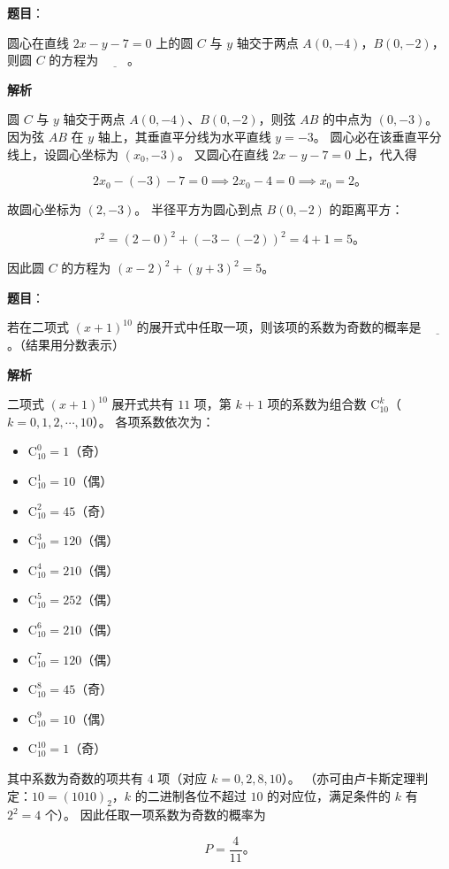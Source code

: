 \begin{answer}

\textbf{题目}：

圆心在直线 $2x - y - 7 = 0$ 上的圆 $C$ 与 $y$ 轴交于两点 $A(0, -4)$，$B(0, -2)$，则圆 $C$ 的方程为 $\underline{\qquad}$。

\textbf{解析}

圆 $C$ 与 $y$ 轴交于两点 $A(0, -4)$、$B(0, -2)$，则弦 $AB$ 的中点为 $(0, -3)$。
因为弦 $AB$ 在 $y$ 轴上，其垂直平分线为水平直线 $y = -3$。
圆心必在该垂直平分线上，设圆心坐标为 $(x_0, -3)$。
又圆心在直线 $2x - y - 7 = 0$ 上，代入得

\nopagebreak[4]
\[
2x_0 - (-3) - 7 = 0 \implies 2x_0 - 4 = 0 \implies x_0 = 2\mbox{。}
\]

故圆心坐标为 $(2, -3)$。
半径平方为圆心到点 $B(0, -2)$ 的距离平方：

\nopagebreak[4]
\[
r^2 = (2 - 0)^2 + (-3 - (-2))^2 = 4 + 1 = 5\mbox{。}
\]

因此圆 $C$ 的方程为 $(x - 2)^2 + (y + 3)^2 = 5$。


\end{answer}
\begin{answer}

\textbf{题目}：

若在二项式 $(x + 1)^{10}$ 的展开式中任取一项，则该项的系数为奇数的概率是 $\underline{\qquad}$。（结果用分数表示）

\textbf{解析}

二项式 $(x + 1)^{10}$ 展开式共有 $11$ 项，第 $k + 1$ 项的系数为组合数 $\mathrm{C}_{10}^k$（$k = 0, 1, 2, \cdots, 10$）。
各项系数依次为：
\begin{itemize}
\item $\mathrm{C}_{10}^0 = 1$（奇）
\item $\mathrm{C}_{10}^1 = 10$（偶）
\item $\mathrm{C}_{10}^2 = 45$（奇）
\item $\mathrm{C}_{10}^3 = 120$（偶）
\item $\mathrm{C}_{10}^4 = 210$（偶）
\item $\mathrm{C}_{10}^5 = 252$（偶）
\item $\mathrm{C}_{10}^6 = 210$（偶）
\item $\mathrm{C}_{10}^7 = 120$（偶）
\item $\mathrm{C}_{10}^8 = 45$（奇）
\item $\mathrm{C}_{10}^9 = 10$（偶）
\item $\mathrm{C}_{10}^{10} = 1$（奇）
\end{itemize}

其中系数为奇数的项共有 $4$ 项（对应 $k = 0, 2, 8, 10$）。
（亦可由卢卡斯定理判定：$10 = (1010)_2$，$k$ 的二进制各位不超过 $10$ 的对应位，满足条件的 $k$ 有 $2^2 = 4$ 个）。
因此任取一项系数为奇数的概率为

\nopagebreak[4]
\[
P = \dfrac{4}{11}\mbox{。}
\]


\end{answer}
